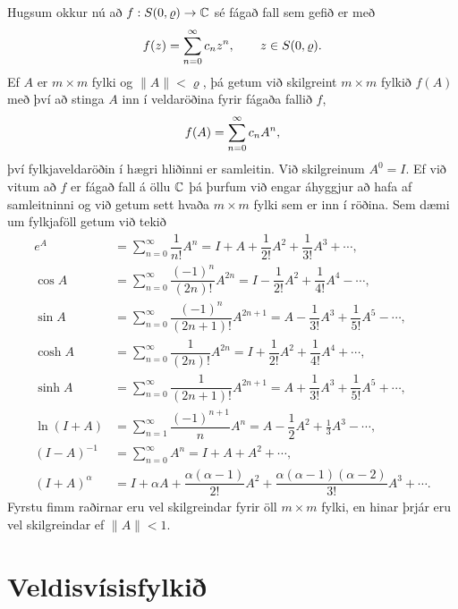 Hugsum okkur nú að $f:S(0,\varrho)\to {\mathbb C}$ 
sé fágað fall sem gefið er með 
 $$f(z)=\sum_{n=0}\sp \infty c_n z\sp n, \qquad z\in S(0,\varrho).
 $$
Ef $A$ er $m\times m$ fylki og $\|A\|< \varrho$, þá getum við
skilgreint $m\times m$ fylkið $f(A)$ með því að stinga $A$ inn í
veldaröðina fyrir fágaða fallið $f$,   
 $$f(A)=\sum_{n=0}\sp \infty c_nA\sp n,
 $$
því fylkjaveldaröðin í hægri hliðinni er samleitin. Við skilgreinum
$A^0=I$.  Ef við vitum að
$f$ er fágað fall á öllu ${\mathbb C}$ þá þurfum við engar áhyggjur að hafa af
samleitninni og við getum sett hvaða $m\times m$ fylki sem er inn í röðina.
Sem dæmi um fylkjaföll getum við tekið
\begin{align*}
e^A&=\sum\limits_{n=0}^\infty\dfrac 1{n!}{A^n}
=I+A+\dfrac {1}{2!}A^2+\dfrac{1}{3!}A^3+\cdots,\\
\cos A&= \sum\limits_{n=0}^\infty \dfrac{(-1)^n}{(2n)!}A^{2n}
=I-\dfrac{1}{2!}A^2+\dfrac{1}{4!}A^4-\cdots,\\
\sin A &=\sum\limits_{n=0}^\infty\dfrac{(-1)^n}{(2n+1)!}A^{2n+1}
= A-\dfrac {1}{3!}A^3+\dfrac{1}{5!}A^5-\cdots,\\
\cosh A&=\sum\limits_{n=0}^\infty\dfrac{1}{(2n)!}A^{2n}
=I+\dfrac{1}{2!}A^2+\dfrac{1}{4!}A^4+\cdots,\\
\sinh A &=\sum\limits_{n=0}^\infty\dfrac{1}{(2n+1)!}A^{2n+1}
= A+\dfrac {1}{3!}A^3+\dfrac{1}{5!}A^5+\cdots,\\
\ln (I+A) &= \sum\limits_{n=1}^\infty\dfrac{(-1)^{n+1}}{n}A^n
=A-\dfrac{1}{2}A^2+\frac{1}3A^3-\cdots,\\
(I-A)^{-1}&=\sum\limits_{n=0}^\infty A^n
=I+A+A^2+\cdots, \\
(I+A)^\alpha&= I+\alpha A+ \dfrac{\alpha(\alpha-1)}{2!}A^2 + 
\dfrac {\alpha(\alpha-1)(\alpha-2)}{3!}A^3+\cdots.
\end{align*}
Fyrstu fimm raðirnar eru vel skilgreindar fyrir öll $m\times m$
fylki, en hinar þrjár eru vel skilgreindar  ef $\|A\|<1$.  

 


\section{Veldisvísisfylkið}

